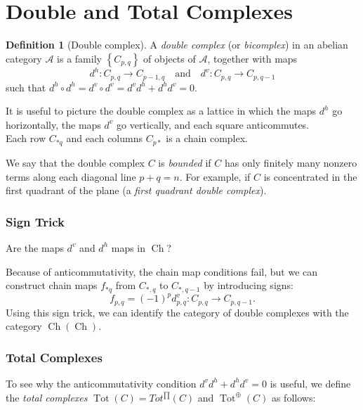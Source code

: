 \documentclass[reqno]{amsart}
\theoremstyle{definition}
\newtheorem{definition}[theorem]{Definition}
\theoremstyle{remark}
\DeclareMathOperator{\Ch}{Ch}
\DeclareMathOperator{\Tot}{Tot}
\begin{document}
\section{Double and Total Complexes}

\begin{definition}[Double complex]
    A \textit{double complex} (or \textit{bicomplex}) in
    an abelian category $\mathcal{A}$ is a family
    $\left\{ C_{p,q} \right\} $ of objects of $\mathcal{A}$,
    together with maps
    \[
    d^{h} \colon C_{p,q} \to C_{p-1,q} \quad
    \text{and} \quad
    d^{v} \colon C_{p,q} \to C_{p,q-1}
    \] 
    such that $d^{h} \circ d^{h} =
    d^{v} \circ d^{v} = d^{v} d^{h} +
    d^{h} d^{v} = 0$.
\end{definition}

It is useful to picture the double complex as a lattice
in which the maps $d^{h}$ go horizontally, the maps
$d^{v}$ go vertically, and each square anticommutes.\\
\linebreak
Each row $C_{*q}$ and each
columns $C_{p*}$ is a chain complex.

We say that the double complex
$C$ is \textit{bounded} if $C$ has only finitely many
nonzero terms along each diagonal line
$p+q = n$.
For example, if $C$ is concentrated in the first quadrant of
the plane (a \textit{first quadrant double complex}).


\subsubsection{Sign Trick}

Are the maps
$d^{v}$ and $d^{h}$ maps in
$\Ch$?

Because of anticommutativity, the chain map conditions fail, but
we can construct chain maps
$f_{*q} $ from $C_{*,q}$ to $C_{*,q-1}$ by introducing signs:
\[
f_{p,q} = (-1)^{p} d_{p,q}^{v} \colon
C_{p,q} \to C_{p,q-1}.
\] 
Using this sign trick, we can identify the category of double
complexes with the category
$\Ch \left( \Ch \right) $.

\subsubsection{Total Complexes}

To see why the anticommutativity condition
$d^{v} d^{h} + d^{h} d^{v} = 0$ is useful,
we define the \textit{total complexes} 
$\Tot (C) = Tot^{\prod} (C)$ and
$\Tot^{\oplus} (C)$ as follows:
\end{document}
